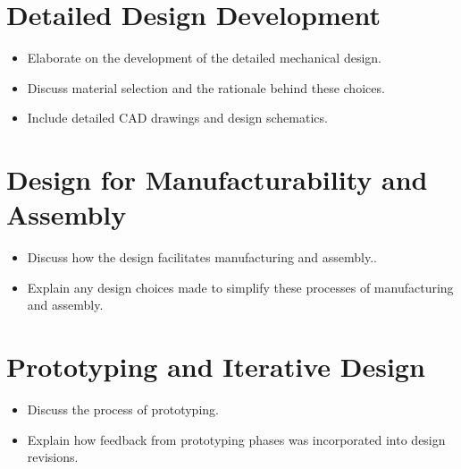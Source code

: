 \section{Detailed Design Development}
\begin{itemize}
	\item Elaborate on the development of the detailed mechanical design.
	\item Discuss material selection and the rationale behind these choices.
	\item Include detailed CAD drawings and design schematics.
\end{itemize}
\section{Design for Manufacturability and Assembly}
\begin{itemize}
	\item Discuss how the design facilitates manufacturing and assembly..
	\item Explain any design choices made to simplify these processes of manufacturing and assembly.
\end{itemize}
\section{Prototyping and Iterative Design}
\begin{itemize}
	\item Discuss the process of prototyping.
	\item Explain how feedback from prototyping phases was incorporated into design revisions.
\end{itemize}

